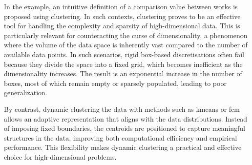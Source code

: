 \begin{modified}
	In the example, an intuitive definition of a comparison value between works is proposed using clustering. In such contexts, clustering proves to be an effective tool for handling the complexity and sparsity of high-dimensional data. This is particularly relevant for counteracting the curse of dimensionality, a phenomenon where the volume of the data space is inherently vast compared to the number of available data points. In such scenarios, rigid box-based discretisations often fail because they divide the space into a fixed grid, which becomes inefficient as the dimensionality increases. The result is an exponential increase in the number of boxes, most of which remain empty or sparsely populated, leading to poor generalization.

	\noindent By contrast, dynamic clustering the data with methods such as \gls{kmeans} or \gls{fcm} allows an adaptive representation that aligns with the data distributions. Instead of imposing fixed boundaries, the centroids are positioned to capture meaningful structures in the data, improving both computational efficiency and empirical performance. This flexibility makes dynamic clustering a practical and effective choice for high-dimensional problems.
\end{modified}

